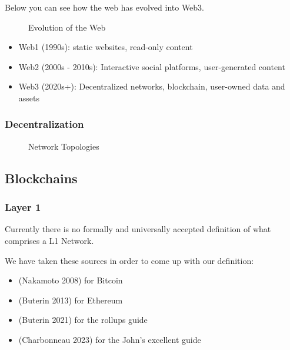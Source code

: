 \documentclass[
  letterpaper,
  DIV=11,
  numbers=noendperiod]{scrreprt}
\makeatletter
\providecommand{\tightlist}{%
  \setlength{\itemsep}{0pt}\setlength{\parskip}{0pt}}\usepackage{longtable,booktabs,array}
\newcommand*\pandocbounded[1]{%
  \sbox\pandoc@box{#1}%
  \Gscale@div\@tempa{\textheight}{\dimexpr\ht\pandoc@box+\dp\pandoc@box\relax}%
  \Gscale@div\@tempb{\linewidth}{\wd\pandoc@box}%
  \ifdim\@tempb\p@<\@tempa\p@\let\@tempa\@tempb\fi%
  \ifdim\@tempa\p@<\p@\scalebox{\@tempa}{\usebox\pandoc@box}%
  \else\usebox{\pandoc@box}%
  \fi%
}
\makeatother
\begin{document}
Below you can see how the web has evolved into Web3.

\begin{figure}[H]

{\centering \pandocbounded{}

}

\caption{Evolution of the Web}

\end{figure}%

\begin{itemize}
\tightlist
\item
  Web1 (1990s): static websites, read-only content
\item
  Web2 (2000s - 2010s): Interactive social platforms, user-generated
  content
\item
  Web3 (2020s+): Decentralized networks, blockchain, user-owned data and
  assets
\end{itemize}

\subsubsection{Decentralization}\label{decentralization}

\begin{figure}[H]

{\centering \pandocbounded{}

}

\caption{Network Topologies}

\end{figure}%

\subsection{Blockchains}\label{blockchains}

\subsubsection{Layer 1}\label{layer-1}

Currently there is no formally and universally accepted definition of
what comprises a L1 Network.

We have taken these sources in order to come up with our definition:

\begin{itemize}
\tightlist
\item
  (Nakamoto 2008) for Bitcoin
\item
  (Buterin 2013) for Ethereum
\item
  (Buterin 2021) for the rollups guide
\item
  (Charbonneau 2023) for the John's excellent guide
\end{itemize}
\end{document}

